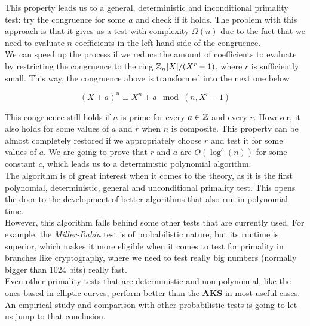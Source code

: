 This property leads us to a general, deterministic and inconditional primality test: try the congruence for some $a$ and check if it holds. The problem with this approach is that it gives us a test with complexity $\Omega(n)$ due to the fact that we need to evaluate $n$ coefficients in the left hand side of the congruence.\\

We can speed up the process if we reduce the amount of coefficients to evaluate by restricting the congruence to the ring $\mathbb{Z}_n[X]/(X^r - 1)$, where $r$ is sufficiently small. This way, the congruence above is transformed into the next one below

\begin{equation}
(X + a)^n \equiv X^n + a \mod(n, X^r - 1)
\end{equation}

This congruence still holds if $n$ is prime for every $a \in \mathbb{Z}$ and every $r$. However, it also holds for some values of $a$ and $r$ when $n$ is composite. This property can be almost completely restored if we appropriately choose $r$ and test it for some values of $a$. We are going to prove that $r$ and $a$ are $O(\log^c(n))$ for some constant $c$, which leads us to a deterministic polynomial algorithm.\\

The algorithm is of great interest when it comes to the theory, as it is the first polynomial, deterministic, general and unconditional primality test. This opens the door to the development of better algorithms that also run in polynomial time.\\

However, this algorithm falls behind some other tests that are currently used. For example, the \textit{Miller-Rabin} test is of probabilistic nature, but its runtime is superior, which makes it more eligible when it comes to test for primality in branches like cryptography, where we need to test really big numbers (normally bigger than $1024$ bits) really fast.\\

Even other primality tests that are deterministic and non-polynomial, like the ones based in elliptic curves, perform better than the \textbf{AKS} in most useful cases.\\

An empirical study and comparison with other probabilistic tests is going to let us jump to that conclusion.\\

